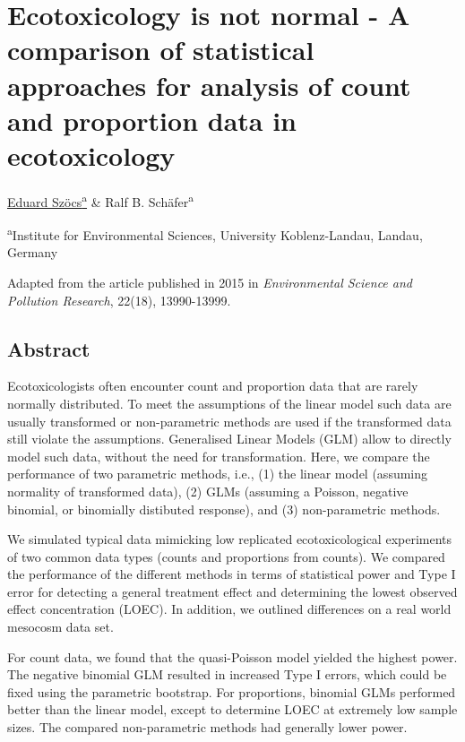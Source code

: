 \chapter[Ecotoxicology is not normal]{Ecotoxicology is not normal - A comparison of statistical approaches for analysis of count and proportion data in ecotoxicology}
\label{sec:usetheglm} 
 
\begin{sloppypar}
\bigskip
\underline{Eduard Szöcs\textsuperscript{a}} \& Ralf B. Schäfer\textsuperscript{a}

\bigskip
\small
\noindent 
\textsuperscript{a}Institute for Environmental Sciences, University Koblenz-Landau, Landau, Germany 

\bigskip 
\normalsize
\noindent
Adapted from the article published in 2015 in \emph{Environmental Science and Pollution Research}, 22(18), 13990-13999.

\end{sloppypar}
\newpage


\section{Abstract}
\label{sec:usetheglm:abstract} 
Ecotoxicologists often encounter count and proportion data that are rarely normally distributed.
To meet the assumptions of the linear model such data are usually transformed or non-parametric methods are used if the transformed data still violate the assumptions.
Generalised Linear Models (GLM) allow to directly model such data, without the need for transformation.
Here, we compare the performance of  two parametric methods, i.e.,  (1) the linear model (assuming normality of transformed data), (2) GLMs (assuming a Poisson, negative binomial, or binomially distibuted response), and (3) non-parametric methods.

We simulated typical data mimicking low replicated ecotoxicological experiments of two common data types (counts and proportions from counts). 
We compared the performance of the different methods in terms of statistical power and Type I error for detecting a general treatment effect and determining the lowest observed effect concentration (LOEC).
In addition, we outlined differences on a real world mesocosm data set.

For count data, we found that the quasi-Poisson model yielded the highest power. The negative binomial GLM resulted in increased Type I errors, which could be fixed using the parametric bootstrap. 
For proportions, binomial GLMs performed better than the linear model, except to determine LOEC at extremely low sample sizes.
The compared non-parametric methods had generally lower power.

